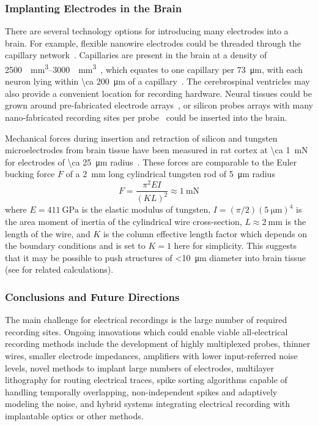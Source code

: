 \subsubsection{Implanting Electrodes in the Brain}

There are several technology options for introducing many electrodes into a brain.
For example, flexible nanowire electrodes could be threaded through the capillary network~\cite{llinas05}.
Capillaries are present in the brain at a density of \SIrange{2500}{3000}{\per\milli\meter\cubed}~\cite{schmidt89}, which equates to one capillary per \SI{73}{\micro\meter}, with each neuron lying within \SI{\ca 200}{\micro\meter} of a capillary~\cite{loffredo08}. 
The cerebrospinal ventricles may also provide a convenient location for recording hardware.
Neural tissues could be grown around pre-fabricated electrode arrays~\cite{jadhav12}, or silicon probes arrays with many nano-fabricated recording sites per probe~\cite{du11} could be inserted into the brain.

Mechanical forces during insertion and retraction of silicon and tungsten microelectrodes from brain tissue have been measured in rat cortex at \SI{\ca 1}{\milli\newton} for electrodes of \SI{\ca 25}{\micro\meter} radius~\cite{jensen03}.
These forces are comparable to the Euler bucking force $F$ of a \SI{2}{\milli\meter} long cylindrical tungsten rod of \SI{5}{\micro\meter} radius
\[F=\frac{\pi^2 E I}{(K L)^2} \approx \SI{1}{\milli\newton}\]
where $E=\SI{411}{\giga\pascal}$ is the elastic modulus of tungsten, $I=(\pi/2)(\SI{5}{\micro\meter})^4$ is the area moment of inertia of the cylindrical wire cross-section, $L\approx\SI{2}{\milli\meter}$ is the length of the wire, and $K$ is the column effective length factor which depends on the boundary conditions and is set to $K=1$ here for simplicity.
This suggests that it may be possible to push structures of \SI{<10}{\micro\meter} diameter into brain tissue (see \cite{najafi90} for related calculations).

\subsubsection{Conclusions and Future Directions}

The main challenge for electrical recordings is the large number of required recording sites.
Ongoing innovations which could enable viable all-electrical recording methods include
the development of highly multiplexed probes, thinner wires, smaller electrode impedances,
amplifiers with lower input-referred noise levels, novel methods to implant large numbers of electrodes,
multilayer lithography for routing electrical traces, spike sorting algorithms capable of handling temporally overlapping, non-independent spikes and adaptively modeling the noise, and hybrid systems integrating electrical recording with
implantable optics or other methods.


